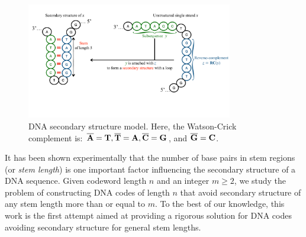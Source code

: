 \documentclass[conference]{IEEEtran}
\theoremstyle{plain}
\theoremstyle{definition}
\renewcommand{\ge}{\geqslant}
\begin{document}

\begin{figure}[h]
\begin{center}
\includegraphics[width=9cm]{drawDNA3.pdf}
\end{center}
\caption{DNA secondary structure model. Here, the Watson-Crick complement is: $\overline{{\bf A}}={\bf T}, \overline{\bf T}={\bf A}, \overline{\bf C}={\bf G}$, and $\overline{\bf G}={\bf C}$.}
\label{fig1}
\end{figure}




It has been shown experimentally that the number of base pairs in stem regions (or {\em stem length}) is one important factor influencing the secondary structure of a DNA sequence. Given codeword length $n$ and an integer $m\ge 2$, we study the problem of constructing DNA codes of length $n$ that avoid secondary structure of any stem length more than or equal to $m$. To the best of our knowledge, this work is the first attempt aimed at providing a rigorous solution for DNA codes avoiding secondary structure for general stem lengths.



\end{document}
